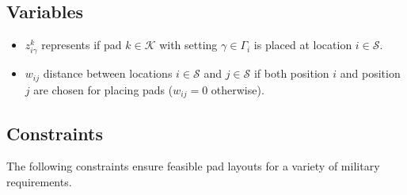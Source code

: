 \documentclass[10pt]{article}
\begin{document}
	\subsection{Variables}
	\begin{itemize}
		\item $z_{i\gamma}^{k} $ represents if pad $ k  \in \mathcal{K}$  with setting $ \gamma \in \Gamma_i$ is placed at location $ i \in \mathcal{S}$.
		\item $ w_{ij} $ distance between locations $ i \in \mathcal{S}$ and $ j\in \mathcal{S}$ if both position $i$ and position $j$ are chosen for placing pads ($w_{ij} = 0$ otherwise).
	\end{itemize}

	\subsection{Constraints}
	\noindent The following constraints ensure feasible pad layouts for a variety of military requirements.
\end{document}
